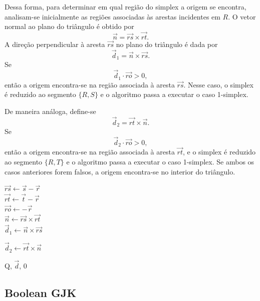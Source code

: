 Dessa forma, para determinar em qual região do simplex a origem se encontra, analisam-se inicialmente as regiões associadas às arestas incidentes em $R$. O vetor normal ao plano do triângulo é obtido por
$$
\vec n = \vec{rs} \times \vec{rt}.
$$
A direção perpendicular à aresta $\vec{rs}$ no plano do triângulo é dada por
$$
\vec d_1 = \vec n \times \vec{rs}.
$$
Se
$$
\vec d_1 \cdot \vec{ro} > 0,
$$
então a origem encontra-se na região associada à aresta $\vec{rs}$. Nesse caso, o simplex é reduzido ao segmento $\{R,S\}$ e o algoritmo passa a executar o caso 1-simplex.

De maneira análoga, define-se
$$
\vec d_2 = \vec{rt} \times \vec n.
$$
Se
$$
\vec d_2 \cdot \vec{ro} > 0,
$$
então a origem encontra-se na região associada à aresta $\vec{rt}$, e o simplex é reduzido ao segmento $\{R,T\}$ e o algoritmo passa a executar o caso 1-simplex. Se ambos os casos anteriores forem falsos, a origem encontra-se no interior do triângulo.

\begin{algorithm}[htb]
	\caption{Caso 2-simplex}

	$\vec{rs} \leftarrow \vec s - \vec r$ \\
	$\vec{rt} \leftarrow \vec t - \vec r$ \\
	$\vec{ro} \leftarrow -\vec r$ \\

	$\vec n \leftarrow \vec{rs} \times \vec{rt}$ \\

	$\vec d_1 \leftarrow \vec n \times \vec{rs}$ \\


	$\vec d_2 \leftarrow \vec{rt} \times \vec n$ \\


	\Return Q, $\vec d$, 0
	\label{alg:ericson-2simplex}
\end{algorithm}

\subsection*{Boolean GJK}

